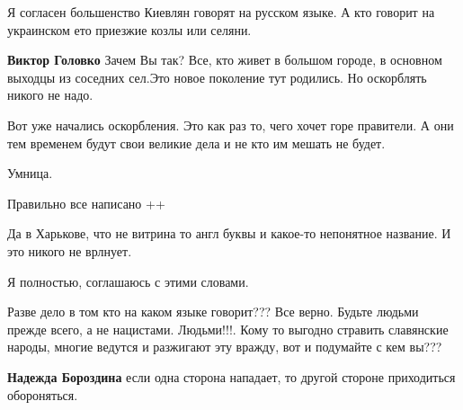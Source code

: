 \begin{itemize}

Я согласен большенство Киевлян говорят на русском языке. А кто говорит на украинском ето приезжие козлы или селяни.

\begin{itemize}

\textbf{Виктор Головко} Зачем Вы так? Все, кто живет в большом городе, в основном выходцы из соседних сел.Это новое поколение тут родились. Но оскорблять никого не надо.

Вот уже начались оскорбления. Это как раз то, чего хочет горе правители. А они тем временем будут свои великие дела и не кто им мешать не будет.
\end{itemize}


Умница.


Правильно все написано ++


Да в Харькове, что не витрина то англ буквы и какое-то непонятное название. И это никого не врлнует.


Я полностью, соглашаюсь с этими словами.



Разве дело в том кто на каком языке говорит??? Все верно. Будьте людьми прежде
всего, а не нацистами. Людьми!!!. Кому то выгодно стравить славянские народы,
многие ведутся и разжигают эту вражду, вот и подумайте с кем вы???

\begin{itemize}

\textbf{Надежда Бороздина} если одна сторона нападает, то другой стороне приходиться обороняться.
\end{itemize}

\end{itemize}

